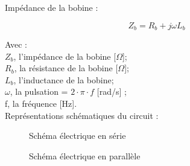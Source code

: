 Impédance de la bobine : 

\begin{equation}
    Z_b = R_b + j \omega L_b
\end{equation}

Avec : \\
$Z_b$, l'impédance de la bobine [$\Omega$];\\
$R_b$, la résistance de la bobine [$\Omega$];\\
$L_b$, l'inductance de la bobine;\\
$\omega$, la pulsation = $ 2 \cdot \pi \cdot f$ [rad/s] ;\\
f, la fréquence [Hz].\\

Représentations schématiques du circuit : 

\begin{figure}[H]
    \begin{minipage}[c]{.50\linewidth}
        \centering
        \caption{Schéma électrique en série }
    \label{fig:SCH1}
    \end{minipage}
    \hfill%
    \begin{minipage}[c]{.50\linewidth}
        \centering
        \caption{Schéma électrique en parallèle }
    \label{fig:SCH2}
    \end{minipage}
\end{figure}

